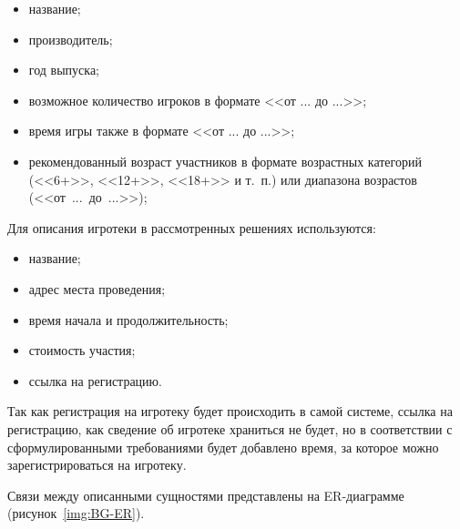 \begin{itemize}
    \item название;
    \item производитель;
    \item год выпуска;
    \item возможное количество игроков в формате <<от ... до ...>>;
    \item время игры также в формате <<от ... до ...>>;
    \item рекомендованный возраст участников в формате возрастных категорий
        (<<6+>>, <<12+>>, <<18+>> и т.~п.) или диапазона возрастов
        (<<от~...~до~...>>);
\end{itemize}



Для описания игротеки в рассмотренных решениях используются:
\begin{itemize}
    \item название;
    \item адрес места проведения;
    \item время начала и продолжительность;
    \item стоимость участия;
    \item ссылка на регистрацию.
\end{itemize}

Так как регистрация на игротеку будет происходить в самой системе, ссылка на
регистрацию, как сведение об игротеке храниться не будет, но в соответствии с
сформулированными требованиями будет добавлено время, за которое можно
зарегистрироваться на игротеку.

Связи между описанными сущностями представлены на ER-диаграмме
(рисунок~\ref{img:BG-ER}).


